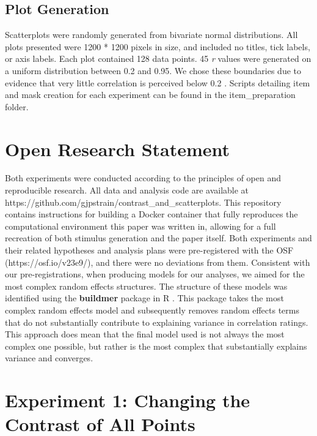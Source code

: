 \documentclass[preprint, 3p,
authoryear]{elsarticle} %
\begin{document}
\hypertarget{plot-generation}{%
\subsection{Plot Generation}\label{plot-generation}}

Scatterplots were randomly generated from bivariate normal
distributions. All plots presented were 1200 * 1200 pixels in size, and
included no titles, tick labels, or axis labels. Each plot contained 128
data points. 45 \emph{r} values were generated on a uniform distribution
between 0.2 and 0.95. We chose these boundaries due to evidence that
very little correlation is perceived below 0.2
\citep{bobko_1979, cleveland_1982, strahan_1978}. Scripts detailing item
and mask creation for each experiment can be found in the
item\_preparation folder.

\hypertarget{open-research-statement}{%
\section{Open Research Statement}\label{open-research-statement}}

Both experiments were conducted according to the principles of open and
reproducible research. All data and analysis code are available at
https://github.com/gjpstrain/contrast\_and\_scatterplots. This
repository contains instructions for building a Docker container that
fully reproduces the computational environment this paper was written
in, allowing for a full recreation of both stimulus generation and the
paper itself. Both experiments and their related hypotheses and analysis
plans were pre-registered with the OSF (https://osf.io/v23e9/), and
there were no deviations from them. Consistent with our
pre-registrations, when producing models for our analyses, we aimed for
the most complex random effects structures. The structure of these
models was identified using the \textbf{buildmer} package in R
\citep{voeten_buildmer_2022}. This package takes the most complex random
effects model and subsequently removes random effects terms that do not
substantially contribute to explaining variance in correlation ratings.
This approach does mean that the final model used is not always the most
complex one possible, but rather is the most complex that substantially
explains variance and converges.

\hypertarget{experiment-1-changing-the-contrast-of-all-points}{%
\section{Experiment 1: Changing the Contrast of All
Points}\label{experiment-1-changing-the-contrast-of-all-points}}
\end{document}
